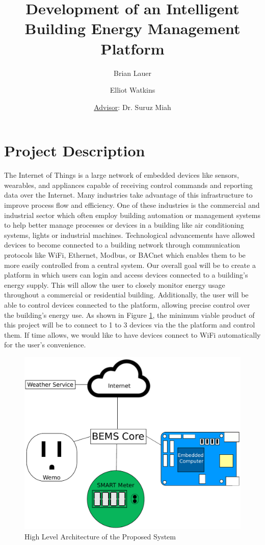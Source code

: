 \documentclass[12pt]{article} %
\title{Development of an Intelligent Building Energy Management Platform}
\author{Brian Lauer \and Elliot Watkins \and \underline{Advisor}: Dr. Suruz Miah
}
\begin{document}
\maketitle

\section{Project Description}
The Internet of Things is a large network of embedded devices like sensors, wearables, and appliances capable of receiving control commands and reporting data over the Internet. Many industries take advantage of this infrastructure to improve process flow and efficiency. One of these industries is the commercial and industrial sector which often employ building automation or management systems to help better manage processes or devices in a building like air conditioning systems, lights or industrial machines. Technological advancements have allowed devices to become connected to a building network through communication protocols like WiFi, Ethernet, Modbus, or BACnet which enables them to be more easily controlled from a central system.
\medbreak\noindent
Our overall goal will be to create a platform in which users can login and access devices connected to a building's energy supply. This will allow the user to closely monitor energy usage throughout a commercial or residential building. Additionally, the user will be able to control devices connected to the platform, allowing precise control over the building's energy use.
\medbreak\noindent
As shown in Figure \ref{fig:highLevelArchitecture}, the minimum viable product of this project will be to connect to 1 to 3 devices via the the platform and control them. If time allows, we would like to have devices connect to WiFi automatically for the user's convenience.

\begin{figure}[H]
    \centering
    \includegraphics[scale=0.35]{figs/highLevelArchitecture.pdf}
    \caption{High Level Architecture of the Proposed System}
    \label{fig:highLevelArchitecture}
\end{figure}
\end{document}
